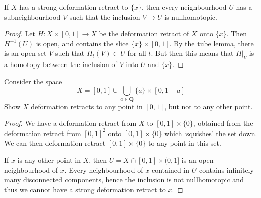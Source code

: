 \begin{theorem}
    If $X$ has a strong deformation retract to $\{ x \}$, then every neighbourhood $U$ has a subneighbourhood $V$ such that the inclusion $V \to U$ is nullhomotopic.
\end{theorem}
\begin{proof}
    Let $H: X \times [0,1] \to X$ be the deformation retract of $X$ onto $\{ x \}$. Then $H^{-1}(U)$ is open, and contains the slice $\{ x \} \times [0,1]$. By the tube lemma, there is an open set $V$ such that $H_t(V) \subset U$ for all $t$. But then this means that $H|_V$ is a homotopy between the inclusion of $V$ into $U$ and $\{ x \}$.
\end{proof}

\begin{theorem}
    Consider the space
    \[ X = [0,1] \cup \bigcup_{a \in \mathbf{Q}} \{ a \} \times [0,1-a] \]
    Show $X$ deformation retracts to any point in $[0,1]$, but not to any other point.
\end{theorem}
\begin{proof}
    We have a deformation retract from $X$ to $[0,1] \times \{ 0 \}$, obtained from the deformation retract from $[0,1]^2$ onto $[0,1] \times \{ 0 \}$ which `squishes' the set down. We can then deformation retract $[0,1] \times \{ 0 \}$ to any point in this set.

    If $x$ is any other point in $X$, then $U = X \cap [0,1] \times (0,1]$ is an open neighbourhood of $x$. Every neighbourhood of $x$ contained in $U$ contains infinitely many disconnected components, hence the inclusion is not nullhomotopic and thus we cannot have a strong deformation retract to $x$.
\end{proof}